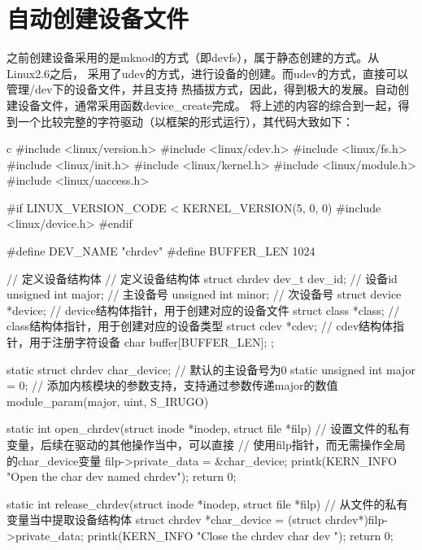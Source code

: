 \section{自动创建设备文件}
之前创建设备采用的是mknod的方式（即devfs），属于静态创建的方式。从Linux2.6之后，
采用了udev的方式，进行设备的创建。而udev的方式，直接可以管理/dev下的设备文件，并且支持
热插拔方式，因此，得到极大的发展。自动创建设备文件，通常采用函数device\_create完成。
将上述的内容的综合到一起，得到一个比较完整的字符驱动（以框架的形式运行），其代码大致如下：
\begin{code-block}{c}
#include <linux/version.h>
#include <linux/cdev.h>
#include <linux/fs.h>
#include <linux/init.h>
#include <linux/kernel.h>
#include <linux/module.h>
#include <linux/uaccess.h>

#if LINUX_VERSION_CODE < KERNEL_VERSION(5, 0, 0)
#include <linux/device.h>
#endif

#define DEV_NAME "chrdev"
#define BUFFER_LEN 1024

// 定义设备结构体
// 定义设备结构体
struct chrdev {
        dev_t          dev_id;  // 设备id
        unsigned int   major;   // 主设备号
        unsigned int   minor;   // 次设备号
        struct device  *device; // device结构体指针，用于创建对应的设备文件
        struct class   *class;  // class结构体指针，用于创建对应的设备类型
        struct cdev    *cdev;   // cdev结构体指针，用于注册字符设备
        char           buffer[BUFFER_LEN];
};

static struct chrdev char_device;
// 默认的主设备号为0
static unsigned int major = 0;
// 添加内核模块的参数支持，支持通过参数传递major的数值
module_param(major, uint, S_IRUGO)

static int open_chrdev(struct inode *inodep, struct file *filp)
{
        // 设置文件的私有变量，后续在驱动的其他操作当中，可以直接
        // 使用filp指针，而无需操作全局的char_device变量
        filp->private_data = &char_device;
        printk(KERN_INFO "Open the char dev named chrdev\n");
        return 0;
}

static int release_chrdev(struct inode *inodep, struct file *filp)
{
        // 从文件的私有变量当中提取设备结构体
        struct chrdev *char_device = (struct chrdev*)filp->private_data;
        printk(KERN_INFO "Close the chrdev char dev \n");
        return 0;
}


\end{code-block}
